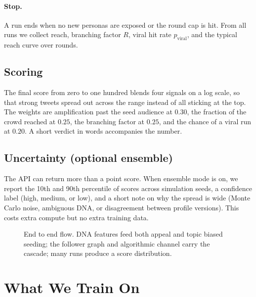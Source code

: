 \documentclass[11pt]{article}
\begin{document}
\paragraph{Stop.}
A run ends when no new personas are exposed or the round cap is hit. From all
runs we collect reach, branching factor $R$, viral hit rate $p_{\text{viral}}$,
and the typical reach curve over rounds.

\subsection{Scoring}
The final score from zero to one hundred blends four signals on a log scale, so
that strong tweets spread out across the range instead of all sticking at the
top. The weights are amplification past the seed audience at \(0.30\), the
fraction of the crowd reached at \(0.25\), the branching factor at \(0.25\), and
the chance of a viral run at \(0.20\). A short verdict in words accompanies the
number.

\subsection{Uncertainty (optional ensemble)}
The API can return more than a point score. When ensemble mode is on, we report
the 10th and 90th percentile of scores across simulation seeds, a confidence
label (high, medium, or low), and a short note on why the spread is wide (Monte
Carlo noise, ambiguous DNA, or disagreement between profile versions). This
costs extra compute but no extra training data.

\begin{figure}[t]
\centering
{}
\caption{End to end flow. DNA features feed both appeal and topic biased seeding;
the follower graph and algorithmic channel carry the cascade; many runs produce a
score distribution.}
\label{fig:pipeline}
\end{figure}

\section{What We Train On}
\end{document}
